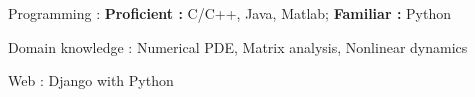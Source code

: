 


\begin{cvskills}


\cvskill
	{Programming : } 
	{\textbf{Proficient :}  C/C++, Java, Matlab; 
	\textbf{Familiar :} Python} 

\cvskill
	{Domain knowledge : }
	{Numerical PDE, Matrix analysis, Nonlinear dynamics}


\cvskill
{Web : } %
{Django with Python}

\end{cvskills}
